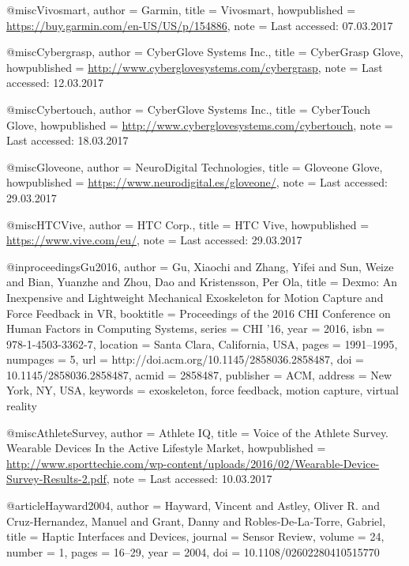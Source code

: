 @misc{Vivosmart,
	author = {Garmin},
	title = {{Vivosmart\textsuperscript{\textregistered}}},
	howpublished = {\url{https://buy.garmin.com/en-US/US/p/154886}},
	note = {Last accessed: 07.03.2017}
}

@misc{Cybergrasp,
	author = {{CyberGlove Systems Inc.}},
	title = {{CyberGrasp Glove}},
	howpublished = {\url{http://www.cyberglovesystems.com/cybergrasp}},
	note = {Last accessed: 12.03.2017}
}

@misc{Cybertouch,
	author = {{CyberGlove Systems Inc.}},
	title = {{CyberTouch Glove}},
	howpublished = {\url{http://www.cyberglovesystems.com/cybertouch}},
	note = {Last accessed: 18.03.2017}
}

@misc{Gloveone,
	author = {{NeuroDigital Technologies}},
	title = {{Gloveone Glove}},
	howpublished = {\url{https://www.neurodigital.es/gloveone/}},
	note = {Last accessed: 29.03.2017}
}

@misc{HTCVive,
	author = {{HTC Corp.}},
	title = {{HTC Vive}},
	howpublished = {\url{https://www.vive.com/eu/}},
	note = {Last accessed: 29.03.2017}
}

@inproceedings{Gu2016,
 author = {Gu, Xiaochi and Zhang, Yifei and Sun, Weize and Bian, Yuanzhe and Zhou, Dao and Kristensson, Per Ola},
 title = {{Dexmo: An Inexpensive and Lightweight Mechanical Exoskeleton for Motion Capture and Force Feedback in VR}},
 booktitle = {Proceedings of the 2016 CHI Conference on Human Factors in Computing Systems},
 series = {CHI '16},
 year = {2016},
 isbn = {978-1-4503-3362-7},
 location = {Santa Clara, California, USA},
 pages = {1991--1995},
 numpages = {5},
 url = {http://doi.acm.org/10.1145/2858036.2858487},
 doi = {10.1145/2858036.2858487},
 acmid = {2858487},
 publisher = {ACM},
 address = {New York, NY, USA},
 keywords = {exoskeleton, force feedback, motion capture, virtual reality}
} 

@misc{AthleteSurvey,
	author = {{Athlete IQ}},
	title = {{ Voice of the Athlete Survey. Wearable Devices In the Active Lifestyle Market}},
	howpublished = {\url{http://www.sporttechie.com/wp-content/uploads/2016/02/Wearable-Device-Survey-Results-2.pdf}},
	note = {Last accessed: 10.03.2017}
}

@article{Hayward2004,
	author = {Hayward, Vincent and Astley, Oliver R. and Cruz‐Hernandez, Manuel and Grant, Danny and Robles‐De‐La‐Torre, Gabriel},
	title = {{Haptic Interfaces and Devices}},
	journal = {Sensor Review},
	volume = {24},
	number = {1},
	pages = {16--29},
	year = {2004},
	doi = {10.1108/02602280410515770}
}


